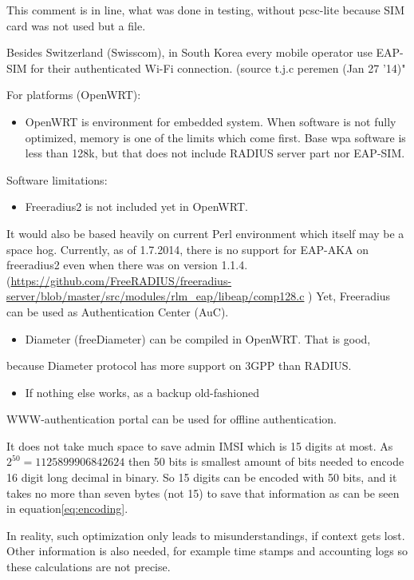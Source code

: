 \documentclass[12pt,a4paper,english]{tutthesis}
\begin{document}
\begin{otherlanguage}{english}
This comment is in line, what was done in testing, without pcsc-lite
because SIM card was not used but a file.

Besides Switzerland (Swisscom), in South Korea every mobile operator
use EAP-SIM for their authenticated Wi-Fi connection.
(source t.j.c peremen (Jan 27 '14)"



For platforms (OpenWRT):
\begin{itemize}
\item OpenWRT is environment for embedded system.
When software is not fully optimized, memory is one of the limits which come first.
Base  wpa software is less than 128k, but 
that does not include RADIUS server part nor EAP-SIM.
\end{itemize}

Software limitations: 
\begin{itemize}
\item Freeradius2 is not included yet in OpenWRT.
\end{itemize}
It would also be based heavily on current Perl environment which
itself may be a space hog. 
Currently, as of 1.7.2014, there is no support for EAP-AKA on
freeradius2 even when there was on version 1.1.4.
(\url{https://github.com/FreeRADIUS/freeradius-server/blob/master/src/modules/rlm_eap/libeap/comp128.c} )
Yet, Freeradius can be used as Authentication Center (AuC).
\begin{itemize}
\item Diameter (freeDiameter) can be compiled in OpenWRT. That is good,
\end{itemize}
because Diameter protocol has more support on 3GPP than RADIUS.
\begin{itemize}
\item If nothing else works, as a backup old-fashioned
\end{itemize}
WWW-authentication portal can be used for offline authentication.

It does not take much space to save admin IMSI which is 15 digits at
most. 
As $2^{50} = 1125899906842624$
then 50 bits is smallest amount of bits needed to encode 16 digit long
decimal in binary. So 15 digits can be encoded with
50 bits,  and it takes no more than seven bytes (not 15) to save that
information as can be seen in equation\ref{eq:encoding}.

In reality, such optimization only leads to misunderstandings, if
context gets lost. Other information is also needed, for example
time stamps and accounting logs so these calculations are not precise.


\end{otherlanguage}
\end{document}
